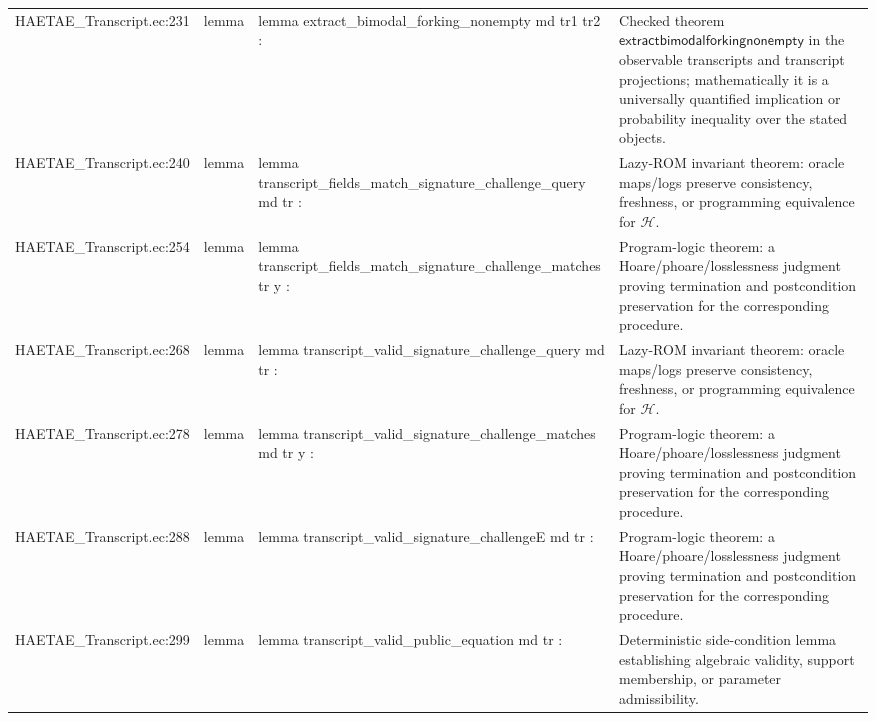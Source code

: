 \documentclass[10pt]{article}
\begin{document}
\begin{longtable}{L{0.11\textwidth}L{0.055\textwidth}L{0.385\textwidth}L{0.41\textwidth}}
HAETAE\_\allowbreak{}Transcript.\allowbreak{}ec:\allowbreak{}231 & lemma & {\ttfamily\scriptsize lemma extract\_\allowbreak{}bimodal\_\allowbreak{}forking\_\allowbreak{}nonempty md tr1 tr2 :} & Checked theorem $\mathsf{extractbimodalforkingnonempty}$ in the observable transcripts and transcript projections; mathematically it is a universally quantified implication or probability inequality over the stated objects. \\
HAETAE\_\allowbreak{}Transcript.\allowbreak{}ec:\allowbreak{}240 & lemma & {\ttfamily\scriptsize lemma transcript\_\allowbreak{}fields\_\allowbreak{}match\_\allowbreak{}signature\_\allowbreak{}challenge\_\allowbreak{}query md tr :} & Lazy-ROM invariant theorem: oracle maps/logs preserve consistency, freshness, or programming equivalence for $\mathcal H$. \\
HAETAE\_\allowbreak{}Transcript.\allowbreak{}ec:\allowbreak{}254 & lemma & {\ttfamily\scriptsize lemma transcript\_\allowbreak{}fields\_\allowbreak{}match\_\allowbreak{}signature\_\allowbreak{}challenge\_\allowbreak{}matches tr y :} & Program-logic theorem: a Hoare/phoare/losslessness judgment proving termination and postcondition preservation for the corresponding procedure. \\
HAETAE\_\allowbreak{}Transcript.\allowbreak{}ec:\allowbreak{}268 & lemma & {\ttfamily\scriptsize lemma transcript\_\allowbreak{}valid\_\allowbreak{}signature\_\allowbreak{}challenge\_\allowbreak{}query md tr :} & Lazy-ROM invariant theorem: oracle maps/logs preserve consistency, freshness, or programming equivalence for $\mathcal H$. \\
HAETAE\_\allowbreak{}Transcript.\allowbreak{}ec:\allowbreak{}278 & lemma & {\ttfamily\scriptsize lemma transcript\_\allowbreak{}valid\_\allowbreak{}signature\_\allowbreak{}challenge\_\allowbreak{}matches md tr y :} & Program-logic theorem: a Hoare/phoare/losslessness judgment proving termination and postcondition preservation for the corresponding procedure. \\
HAETAE\_\allowbreak{}Transcript.\allowbreak{}ec:\allowbreak{}288 & lemma & {\ttfamily\scriptsize lemma transcript\_\allowbreak{}valid\_\allowbreak{}signature\_\allowbreak{}challengeE md tr :} & Program-logic theorem: a Hoare/phoare/losslessness judgment proving termination and postcondition preservation for the corresponding procedure. \\
HAETAE\_\allowbreak{}Transcript.\allowbreak{}ec:\allowbreak{}299 & lemma & {\ttfamily\scriptsize lemma transcript\_\allowbreak{}valid\_\allowbreak{}public\_\allowbreak{}equation md tr :} & Deterministic side-condition lemma establishing algebraic validity, support membership, or parameter admissibility. \\

\end{longtable}
\end{document}
